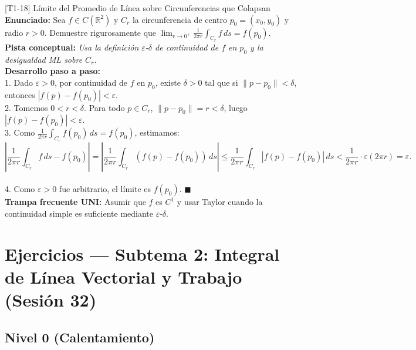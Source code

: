 \documentclass[11pt,a4paper]{article}
\begin{document}
\begin{ejerciciobox}{[T1-18] Límite del Promedio de Línea sobre Circunferencias que Colapsan}
\textbf{Enunciado:} Sea $f \in C(\mathbb{R}^2)$ y $C_r$ la circunferencia de centro $p_0 = (x_0, y_0)$ y radio $r > 0$. Demuestre rigurosamente que $\lim_{r \to 0^+} \frac{1}{2\pi r} \int_{C_r} f\,ds = f(p_0)$.\\[0.2cm]
\textbf{Pista conceptual:} \emph{Usa la definición $\varepsilon$-$\delta$ de continuidad de $f$ en $p_0$ y la desigualdad ML sobre $C_r$.}\\[0.2cm]
\textbf{Desarrollo paso a paso:}\\
1. Dado $\varepsilon > 0$, por continuidad de $f$ en $p_0$, existe $\delta > 0$ tal que si $\|p - p_0\| < \delta$, entonces $|f(p) - f(p_0)| < \varepsilon$.\\
2. Tomemos $0 < r < \delta$. Para todo $p \in C_r$, $\|p - p_0\| = r < \delta$, luego $|f(p) - f(p_0)| < \varepsilon$.\\
3. Como $\frac{1}{2\pi r}\int_{C_r} f(p_0)\,ds = f(p_0)$, estimamos:\\
$$\left|\frac{1}{2\pi r}\int_{C_r} f\,ds - f(p_0)\right| = \left|\frac{1}{2\pi r}\int_{C_r} (f(p) - f(p_0))\,ds\right| \le \frac{1}{2\pi r}\int_{C_r} |f(p)-f(p_0)|\,ds < \frac{1}{2\pi r} \cdot \varepsilon(2\pi r) = \varepsilon.$$\\
4. Como $\varepsilon > 0$ fue arbitrario, el límite es $f(p_0)$. $\blacksquare$\\[0.2cm]
\textbf{Trampa frecuente UNI:} Asumir que $f$ es $C^1$ y usar Taylor cuando la continuidad simple es suficiente mediante $\varepsilon$-$\delta$.
\end{ejerciciobox}

\section{Ejercicios --- Subtema 2: Integral de Línea Vectorial y Trabajo (Sesión 32)}

\subsection{Nivel 0 (Calentamiento)}
\end{document}
